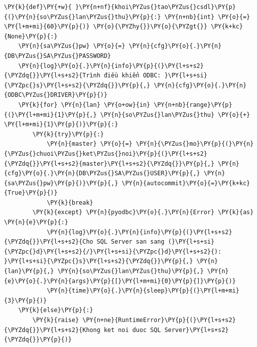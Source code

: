 \begin{Verbatim}[commandchars=\\\{\},frame=single,framerule=0.3pt,rulecolor=\color{black!40},fontsize=\footnotesize,breaklines=true]
\PY{k}{def}\PY{+w}{ }\PY{n+nf}{khoi\PYZus{}tao\PYZus{}csdl}\PY{p}{(}\PY{n}{so\PYZus{}lan\PYZus{}thu}\PY{p}{:} \PY{n+nb}{int} \PY{o}{=} \PY{l+m+mi}{60}\PY{p}{)} \PY{o}{\PYZhy{}}\PY{o}{\PYZgt{}} \PY{k+kc}{None}\PY{p}{:}
    \PY{n}{sa\PYZus{}pw} \PY{o}{=} \PY{n}{cfg}\PY{o}{.}\PY{n}{DB\PYZus{}SA\PYZus{}PASSWORD}
    \PY{n}{log}\PY{o}{.}\PY{n}{info}\PY{p}{(}\PY{l+s+s2}{\PYZdq{}}\PY{l+s+s2}{Trình điều khiển ODBC: }\PY{l+s+si}{\PYZpc{}s}\PY{l+s+s2}{\PYZdq{}}\PY{p}{,} \PY{n}{cfg}\PY{o}{.}\PY{n}{ODBC\PYZus{}DRIVER}\PY{p}{)}
    \PY{k}{for} \PY{n}{lan} \PY{o+ow}{in} \PY{n+nb}{range}\PY{p}{(}\PY{l+m+mi}{1}\PY{p}{,} \PY{n}{so\PYZus{}lan\PYZus{}thu} \PY{o}{+} \PY{l+m+mi}{1}\PY{p}{)}\PY{p}{:}
        \PY{k}{try}\PY{p}{:}
            \PY{n}{master} \PY{o}{=} \PY{n}{\PYZus{}mo}\PY{p}{(}\PY{n}{\PYZus{}chuoi\PYZus{}ket\PYZus{}noi}\PY{p}{(}\PY{l+s+s2}{\PYZdq{}}\PY{l+s+s2}{master}\PY{l+s+s2}{\PYZdq{}}\PY{p}{,} \PY{n}{cfg}\PY{o}{.}\PY{n}{DB\PYZus{}SA\PYZus{}USER}\PY{p}{,} \PY{n}{sa\PYZus{}pw}\PY{p}{)}\PY{p}{,} \PY{n}{autocommit}\PY{o}{=}\PY{k+kc}{True}\PY{p}{)}
            \PY{k}{break}
        \PY{k}{except} \PY{n}{pyodbc}\PY{o}{.}\PY{n}{Error} \PY{k}{as} \PY{n}{e}\PY{p}{:}
            \PY{n}{log}\PY{o}{.}\PY{n}{info}\PY{p}{(}\PY{l+s+s2}{\PYZdq{}}\PY{l+s+s2}{Cho SQL Server san sang (}\PY{l+s+si}{\PYZpc{}d}\PY{l+s+s2}{/}\PY{l+s+si}{\PYZpc{}d}\PY{l+s+s2}{): }\PY{l+s+si}{\PYZpc{}s}\PY{l+s+s2}{\PYZdq{}}\PY{p}{,} \PY{n}{lan}\PY{p}{,} \PY{n}{so\PYZus{}lan\PYZus{}thu}\PY{p}{,} \PY{n}{e}\PY{o}{.}\PY{n}{args}\PY{p}{[}\PY{l+m+mi}{0}\PY{p}{]}\PY{p}{)}
            \PY{n}{time}\PY{o}{.}\PY{n}{sleep}\PY{p}{(}\PY{l+m+mi}{3}\PY{p}{)}
    \PY{k}{else}\PY{p}{:}
        \PY{k}{raise} \PY{n+ne}{RuntimeError}\PY{p}{(}\PY{l+s+s2}{\PYZdq{}}\PY{l+s+s2}{Khong ket noi duoc SQL Server}\PY{l+s+s2}{\PYZdq{}}\PY{p}{)}


\end{Verbatim}
